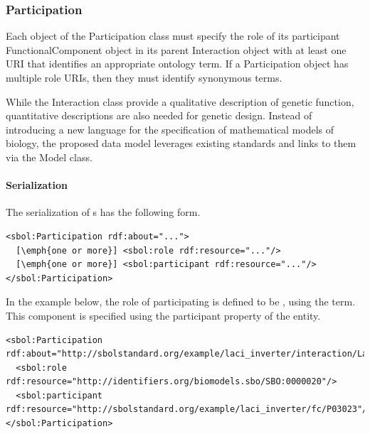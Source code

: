 \subsubsection{Participation}
\label{sec:Participation}


Each object of the Participation class must specify the role of its participant FunctionalComponent object in its parent Interaction object with at least one URI that identifies an appropriate ontology term. If a Participation object has multiple role URIs, then they must identify synonymous terms. 



While the Interaction class provide a qualitative description of genetic function, quantitative descriptions are also needed for genetic design. Instead of introducing a new language for the specification of mathematical models of biology, the proposed data model leverages existing standards and links to them via the Model class. 

\paragraph{Serialization}

The serialization of s has the following form.
\begin{lstlisting}
<sbol:Participation rdf:about="...">
  [\emph{one or more}] <sbol:role rdf:resource="..."/>
  [\emph{one or more}] <sbol:participant rdf:resource="..."/>
</sbol:Participation>
\end{lstlisting}

In the example below, the role of participating  is defined to be , using the  term. This component is specified using the participant property of the  entity.
\begin{lstlisting}
<sbol:Participation rdf:about="http://sbolstandard.org/example/laci_inverter/interaction/LacI_pLacI/participation/P03023">
  <sbol:role rdf:resource="http://identifiers.org/biomodels.sbo/SBO:0000020"/>
  <sbol:participant rdf:resource="http://sbolstandard.org/example/laci_inverter/fc/P03023"/>
</sbol:Participation>
\end{lstlisting}

